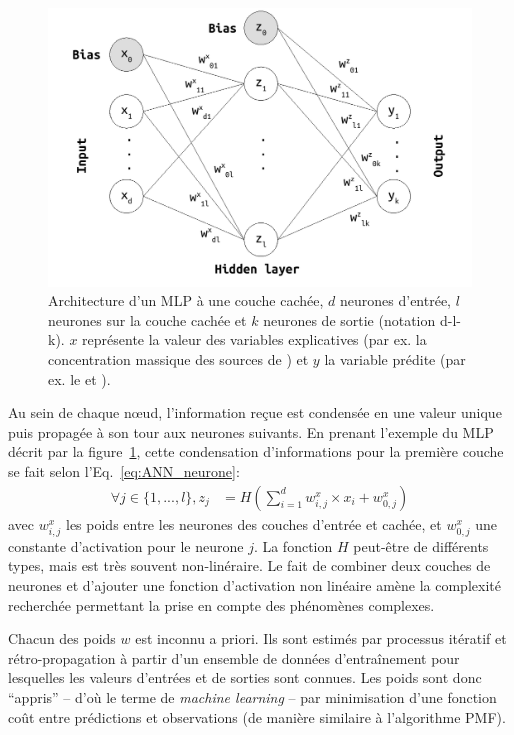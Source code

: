 \begin{figure}[ht]
    \centering
    \includegraphics[width=0.7\linewidth]{figures/chapter05/MLP_architecture.pdf}
    \caption[Architecture simplifée d'un MLP à une couche cachée]{Architecture d'un MLP à une couche cachée, $d$ neurones d'entrée, $l$
    neurones sur la couche cachée et $k$ neurones de sortie (notation d-l-k). $x$
    représente la valeur des variables explicatives (par ex. la concentration massique des
    sources de \PMdix) et $y$ la variable prédite (par ex. le \POAAv{} et \PODTTv).}%
    \label{fig:MLP_architecture}
\end{figure}

Au sein de chaque nœud, l'information reçue est condensée en une valeur unique puis propagée à
son tour aux neurones suivants. En prenant l'exemple du MLP décrit par la
figure~\ref{fig:MLP_architecture}, cette condensation d'informations pour la première
couche se fait selon l'Eq.~\ref{eq:ANN_neurone}:
\begin{align}
    \label{eq:ANN_neurone}
    \forall j \in \{1, ..., l\}, z_j &= H\left( \sum_{i=1}^d w^x_{i,j} \times x_i + w^x_{0,j} \right)
\end{align}
avec $w^x_{i,j}$ les poids entre les neurones des couches d'entrée et cachée, et
$w^x_{0,j}$ une constante d'activation pour le neurone $j$. La fonction $H$
peut-être de différents types, mais est très souvent non-linéraire. Le fait de combiner
deux
couches de neurones et d'ajouter une fonction d'activation non linéaire amène la
complexité recherchée permettant la prise en compte des phénomènes complexes.

Chacun des poids $w$ est inconnu a priori. Ils sont estimés par processus itératif et
rétro-propagation à partir d'un ensemble de données d'entraînement pour lesquelles les
valeurs d'entrées et de sorties sont connues. Les poids sont donc ``appris'' -- d'où le
terme de \textit{machine learning} -- par minimisation d'une fonction coût entre prédictions
et observations (de manière similaire à l'algorithme PMF).

